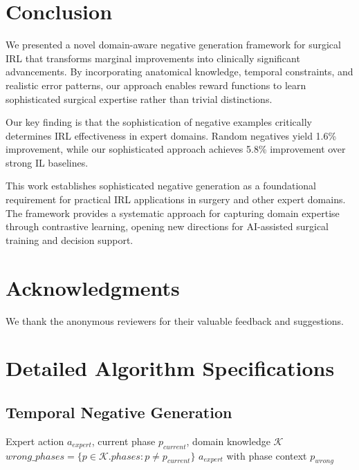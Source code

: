 \documentclass[runningheads]{llncs}
\begin{document}
\section{Conclusion}

We presented a novel domain-aware negative generation framework for surgical IRL that transforms marginal improvements into clinically significant advancements. By incorporating anatomical knowledge, temporal constraints, and realistic error patterns, our approach enables reward functions to learn sophisticated surgical expertise rather than trivial distinctions.

Our key finding is that the sophistication of negative examples critically determines IRL effectiveness in expert domains. Random negatives yield 1.6\% improvement, while our sophisticated approach achieves 5.8\% improvement over strong IL baselines.

This work establishes sophisticated negative generation as a foundational requirement for practical IRL applications in surgery and other expert domains. The framework provides a systematic approach for capturing domain expertise through contrastive learning, opening new directions for AI-assisted surgical training and decision support.

\section*{Acknowledgments}
We thank the anonymous reviewers for their valuable feedback and suggestions.




\appendix

\section{Detailed Algorithm Specifications}

\subsection{Temporal Negative Generation}
\begin{algorithmic}[1]
\REQUIRE Expert action $a_{expert}$, current phase $p_{current}$, domain knowledge $\mathcal{K}$
\STATE $wrong\_phases = \{p \in \mathcal{K}.phases : p \neq p_{current}\}$
        \RETURN $a_{expert}$ with phase context $p_{wrong}$
    \ENDIF
\ENDFOR
\end{algorithmic}
\end{document}
